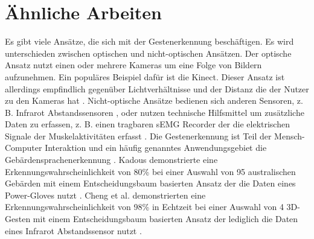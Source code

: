 \section{Ähnliche Arbeiten}
Es gibt viele Ansätze, die sich mit der Gestenerkennung beschäftigen. Es wird unterschieden zwischen optischen und nicht-optischen Ansätzen. Der optische Ansatz nutzt einen
oder mehrere Kameras um eine Folge von Bildern aufzunehmen. Ein populäres Beispiel dafür ist die Kinect. Dieser Ansatz ist allerdings empfindlich gegenüber Lichtverhältnisse und der Distanz die der
Nutzer zu den Kameras hat \cite{song2019design}. Nicht-optische Ansätze bedienen sich anderen Sensoren, z. B. Infrarot Abstandssensoren \cite{cheng2011contactless}, oder nutzen technische Hilfsmittel um zusätzliche Daten zu
erfassen, z. B. einen tragbaren sEMG Recorder der die elektrischen Signale der Muskelaktivitäten erfasst \cite{song2019design}.
\newline
\newline
Die Gestenerkennung ist Teil der Mensch-Computer Interaktion und ein häufig genanntes Anwendungsgebiet die Gebärdensprachenerkennung \cite{fang2003large}. Kadous demonstrierte eine Erkennungswahrscheinlichkeit von 80\%
bei einer Auswahl von 95 australischen Gebärden mit einem Entscheidungsbaum basierten Ansatz der die Daten eines Power-Gloves nutzt \cite{kadous1996machine}. Cheng et al. demonstrierten eine
Erkennungswahrscheinlichkeit von 98\% in Echtzeit bei einer Auswahl von 4 3D-Gesten mit einem Entscheidungsbaum basierten Ansatz der lediglich die Daten eines Infrarot Abstandssensor nutzt \cite{cheng2011contactless}.
